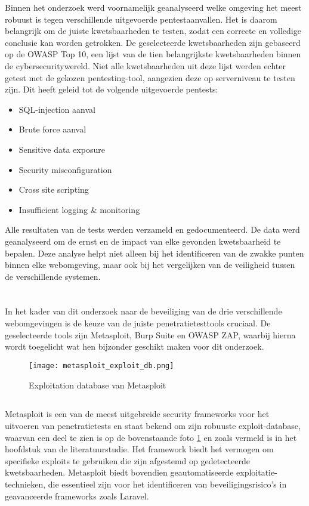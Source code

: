 Binnen het onderzoek werd voornamelijk geanalyseerd welke omgeving het meest robuust is tegen verschillende uitgevoerde pentestaanvallen. 
Het is daarom belangrijk om de juiste kwetsbaarheden te testen, zodat een correcte en volledige conclusie kan worden 
getrokken. De geselecteerde kwetsbaarheden zijn gebaseerd op de OWASP Top 10, een lijst van de tien belangrijkste 
kwetsbaarheden binnen de cybersecuritywereld. Niet alle kwetsbaarheden uit deze lijst werden echter getest met de 
gekozen pentesting-tool, aangezien deze op serverniveau te testen zijn. Dit heeft geleid tot de volgende uitgevoerde pentests:

\begin{itemize}
    \item SQL-injection aanval
    \item Brute force aanval
    \item Sensitive data exposure
    \item Security misconfiguration
    \item Cross site scripting
    \item Insufficient logging \& monitoring 
\end{itemize}

Alle resultaten van de tests werden verzameld en gedocumenteerd. De data werd geanalyseerd 
om de ernst en de impact van elke gevonden kwetsbaarheid te bepalen. Deze analyse helpt niet alleen bij 
het identificeren van de zwakke punten binnen elke webomgeving, maar ook bij het vergelijken van de 
veiligheid tussen de verschillende systemen.

\section{}
In het kader van dit onderzoek naar de beveiliging van de drie verschillende webomgevingen is de keuze van 
de juiste penetratietesttools cruciaal. De geselecteerde tools zijn 
Metasploit, Burp Suite en OWASP ZAP, waarbij hierna wordt toegelicht wat hen bijzonder geschikt maken voor dit onderzoek.
\begin{figure}
    \centering
    \texttt{[image: metasploit\_exploit\_db.png]}
    \caption[Exploitation database van Metasploit]{Exploitation database van Metasploit}
    \label{fig:exploitatie_db}
\end{figure}
\subsection{}
Metasploit is een van de meest uitgebreide security frameworks voor het uitvoeren van penetratietests en staat bekend om 
zijn robuuste exploit-database, waarvan een deel te zien is op de bovenstaande foto \ref{fig:exploitatie_db} en zoals vermeld is in het hoofdstuk  van de 
literatuurstudie. Het framework biedt het vermogen om specifieke exploits te gebruiken die zijn afgestemd op gedetecteerde 
kwetsbaarheden. Metasploit biedt bovendien geautomatiseerde exploitatie-technieken, die essentieel zijn voor het identificeren 
van beveiligingsrisico's in geavanceerde frameworks zoals Laravel. 

